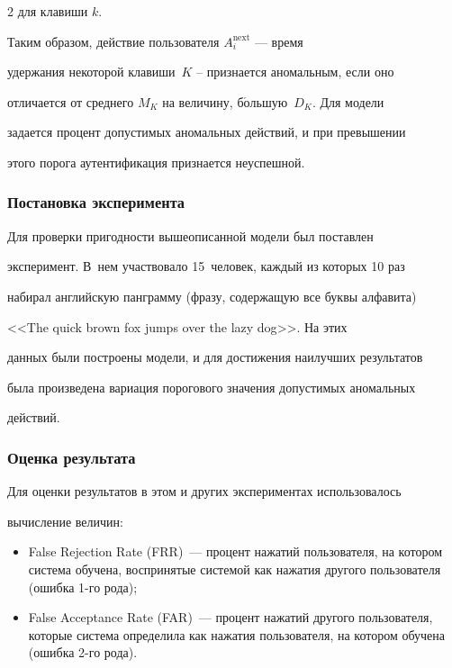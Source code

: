 \begin{multicols}{2}
для клавиши $k$.



Таким образом, действие пользователя $A^{\mathrm{next}}_i$ --- время

удержания некоторой клавиши~$K$ -- признается аномальным, если оно

отличается от среднего $M_K$ на величину, б$\acute{\mbox{о}}$льшую~$D_K$. Для модели

задается процент допустимых аномальных действий, и при превышении

этого порога аутентификация признается неуспешной.



\subsubsection{Постановка эксперимента}

Для проверки пригодности вышеописанной модели был поставлен

эксперимент. В~нем участвовало 15~человек, каждый из которых 10 раз

набирал английскую панграмму (фразу, содержащую все буквы алфавита)

<<{\sf The quick brown fox jumps over the lazy dog}>>. На этих

данных были построены модели, и для достижения наилучших результатов

была произведена вариация порогового значения допустимых аномальных

действий.



\subsubsection{Оценка результата}\label{shortres}

Для оценки результатов в этом и других экспериментах использовалось

вычисление величин:

\begin{itemize}

    \item False Rejection Rate (FRR)~--- процент нажатий пользователя, на  котором система обучена, воспринятые системой как нажатия другого пользователя (ошибка 1-го рода);

    \item  False Acceptance Rate (FAR)~--- процент нажатий другого пользователя, которые система определила как нажатия пользователя, на котором обучена (ошибка 2-го рода).


\end{itemize}
\end{multicols}
